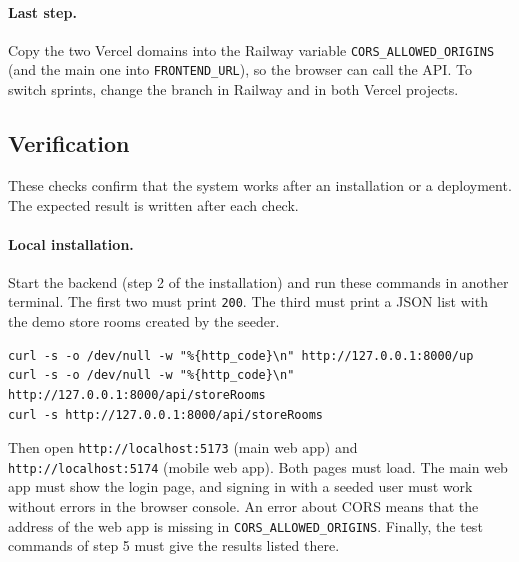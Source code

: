 \paragraph{Last step.}
Copy the two Vercel domains into the Railway variable \texttt{CORS\_ALLOWED\_ORIGINS} (and the main one into \texttt{FRONTEND\_URL}), so the browser can call the API\@.
To switch sprints, change the branch in Railway and in both Vercel projects.

\subsection{Verification}

These checks confirm that the system works after an installation or a deployment.
The expected result is written after each check.

\paragraph{Local installation.}
Start the backend (step 2 of the installation) and run these commands in another terminal.
The first two must print \texttt{200}.
The third must print a JSON list with the demo store rooms created by the seeder.
\begin{lstlisting}[language={}]
curl -s -o /dev/null -w "%{http_code}\n" http://127.0.0.1:8000/up
curl -s -o /dev/null -w "%{http_code}\n" http://127.0.0.1:8000/api/storeRooms
curl -s http://127.0.0.1:8000/api/storeRooms
\end{lstlisting}
Then open \texttt{http://localhost:5173} (main web app) and \texttt{http://localhost:5174} (mobile web app).
Both pages must load.
The main web app must show the login page, and signing in with a seeded user must work without errors in the browser console.
An error about CORS means that the address of the web app is missing in \texttt{CORS\_ALLOWED\_ORIGINS}.
Finally, the test commands of step 5 must give the results listed there.

